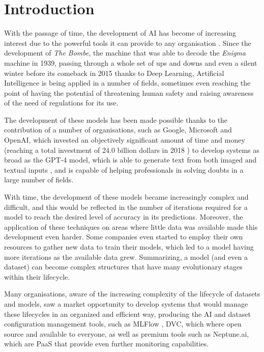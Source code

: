 \chapter{Introduction}
\label{cap:Introduction}

With the passage of time, the development of \acrfull{AI} has become of increasing interest due to the powerful tools it can provide to any
organisation \cite{AIRise}. Since the development of \emph{The Bombe}, the machine that was able to decode the \emph{Enigma} machine in 1939,
passing through a whole set of ups and downs and even a silent winter before its comeback in 2015 thanks to Deep Learning, Artificial Intelligence
is being applied in a number of fields, sometimes even reaching the point of having the potential of threatening human safety and raising awareness
of the need of regulations for its use.

The development of these models has been made possible thanks to the contribution of a number of organisations, such as Google, Microsoft and OpenAI,
which invested an objectively significant amount of time and money (reaching a total investment of 24.0 billion dollars in 2018 \cite{AIRise}) to develop systems as
broad as the GPT-4 model, which is able to generate text from both imaged and textual inputs \cite{GPT4}, and is capable of helping professionals in solving
doubts in a large number of fields.

With time, the development of these models became increasingly complex and difficult, and this would be reflected in the number of iterations required for
a model to reach the desired level of accuracy in its predictions. Moreover, the application of these techniques on areas where little data was available
made this development even harder. Some companies even started to employ their own resources to gather new data to train their models, which led to a model
having more iterations as the available data grew. Summarizing, a model (and even a dataset) can become complex structures that have many evolutionary
stages within their lifecycle.

Many organisations, aware of the increasing complexity of the lifecycle of datasets and models, saw a market opportunity to develop systems that would manage
these lifecycles in an organized and efficient way, producing the AI and dataset configuration management tools, such as MLFlow \cite{MLflow}, DVC, which where
open source and available to everyone, as well as premium tools such as Neptune.ai, which are \acrfull{PaaS} that provide even further monitoring
capabilities.

